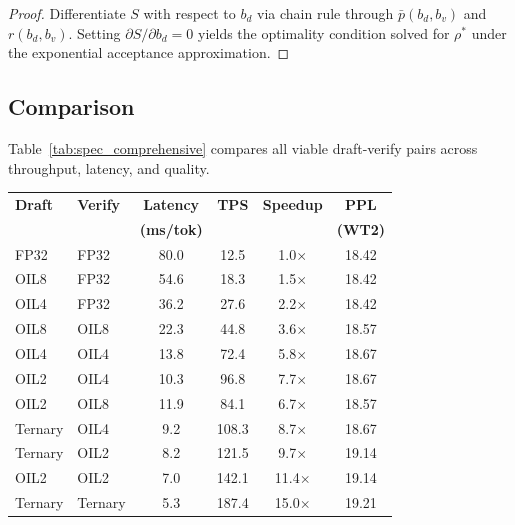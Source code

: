 \begin{proof}
Differentiate $S$ with respect to $b_d$ via chain rule through
$\bar{p}(b_d,b_v)$ and $r(b_d,b_v)$. Setting $\partial S/\partial
b_d = 0$ yields the optimality condition solved for $\rho^*$ under the
exponential acceptance approximation.
\end{proof}

\subsection{Comparison}

Table~\ref{tab:spec_comprehensive} compares all viable draft-verify
pairs across throughput, latency, and quality.

\begin{center}
\begin{tabular}{llcccc}
\toprule
\textbf{Draft} & \textbf{Verify} & \textbf{Latency}
  & \textbf{TPS} & \textbf{Speedup} & \textbf{PPL} \\
 &  & \textbf{(ms/tok)} & &  & \textbf{(WT2)} \\
\midrule
FP32   & FP32   & 80.0 & 12.5   & 1.0$\times$  & 18.42 \\
OIL8   & FP32   & 54.6 & 18.3   & 1.5$\times$  & 18.42 \\
OIL4   & FP32   & 36.2 & 27.6   & 2.2$\times$  & 18.42 \\
OIL8   & OIL8   & 22.3 & 44.8   & 3.6$\times$  & 18.57 \\
OIL4   & OIL4   & 13.8 & 72.4   & 5.8$\times$  & 18.67 \\
OIL2   & OIL4   & 10.3 & 96.8   & 7.7$\times$  & 18.67 \\
OIL2   & OIL8   & 11.9 & 84.1   & 6.7$\times$  & 18.57 \\
Ternary & OIL4 & 9.2  & 108.3  & 8.7$\times$  & 18.67 \\
Ternary & OIL2 & 8.2  & 121.5  & 9.7$\times$  & 19.14 \\
OIL2   & OIL2   & 7.0  & 142.1  & 11.4$\times$ & 19.14 \\
Ternary & Ternary & 5.3 & 187.4 & 15.0$\times$ & 19.21 \\
\bottomrule
\end{tabular}
\end{center}

\label{tab:spec_comprehensive}

